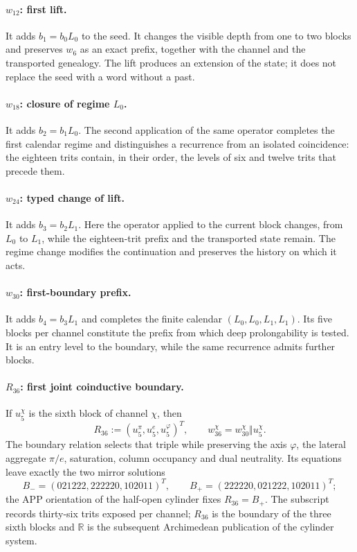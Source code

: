 \paragraph{\(w_{12}\): first lift.}
It adds \(b_1=b_0L_0\) to the seed. It changes the visible depth from one to two
blocks and preserves \(w_6\) as an exact prefix, together with the channel and the
transported genealogy. The lift produces an extension of the state; it does not
replace the seed with a word without a past.

\paragraph{\(w_{18}\): closure of regime \(L_0\).}
It adds \(b_2=b_1L_0\). The second application of the same operator completes the
first calendar regime and distinguishes a recurrence from an isolated
coincidence: the eighteen trits contain, in their order, the levels of six and
twelve trits that precede them.

\paragraph{\(w_{24}\): typed change of lift.}
It adds \(b_3=b_2L_1\). Here the operator applied to the current block changes,
from \(L_0\) to \(L_1\), while the eighteen-trit prefix and the
transported state remain. The regime change modifies the continuation and preserves
the history on which it acts.

\paragraph{\(w_{30}\): first-boundary prefix.}
It adds \(b_4=b_3L_1\) and completes the finite calendar
\((L_0,L_0,L_1,L_1)\). Its five blocks per channel constitute the prefix
from which deep prolongability is tested. It is an entry level to
the boundary, while the same recurrence admits further blocks.

\paragraph{\(R_{36}\): first joint coinductive boundary.}
If \(u_5^\chi\) is the sixth block of channel \(\chi\), then
\[
 R_{36}:=(u_5^\pi,u_5^e,u_5^\varphi)^T,
 \qquad
 w_{36}^\chi=w_{30}^\chi\Vert u_5^\chi.
\]
The boundary relation selects that triple while preserving the axis
\(\varphi\), the lateral aggregate \(\pi/e\), saturation, column
occupancy and dual neutrality. Its equations leave exactly the two
mirror solutions
\[
 B_-=(021222,222220,102011)^T,
 \qquad
 B_+=(222220,021222,102011)^T;
\]
the APP orientation of the half-open cylinder fixes
\(R_{36}=B_+\). The subscript records thirty-six trits
exposed per channel; \(R_{36}\) is the boundary of the three sixth blocks and
\(\mathbb R\) is the subsequent Archimedean publication of the cylinder
system.

